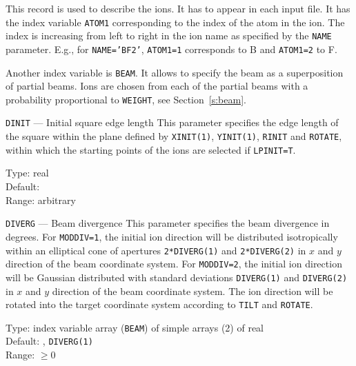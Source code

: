 This record is used to describe the ions. It has to appear in each input file. 
It has the index variable \texttt{ATOM1} corresponding to the index of the atom
in the ion. The index is increasing from left to right in the ion name as
specified by the \texttt{NAME} parameter. E.g., for \texttt{NAME='BF2'},
\texttt{ATOM1=1} corresponds to B and \texttt{ATOM1=2} to F. 

Another index variable is \texttt{BEAM}. It allows to specify the beam as a
superposition of partial beams. Ions are chosen from each of the partial beams
with a probability proportional to \texttt{WEIGHT}, see Section~\ref{s:beam}.

\ifprivate
\begin{keydescription}{\texttt{DINIT} --- Initial square edge length}
%
  This parameter specifies the edge length of the square within the
  plane defined by \texttt{XINIT(1)}, \texttt{YINIT(1)}, \texttt{RINIT} and
  \texttt{ROTATE}, within which the starting points of the ions are
  selected if \texttt{LPINIT=T}.
%
  \begin{keytab}
    Type:    \> real \\
    Default:  \\
    Range:   \> arbitrary
  \end{keytab}
\end{keydescription}
\fi

\begin{keydescription}{\texttt{DIVERG} --- Beam divergence}
%
  This parameter specifies the beam divergence in degrees. For
  \texttt{MODDIV=1}, the initial ion direction will be distributed
  isotropically within an elliptical cone of apertures \texttt{2*DIVERG(1)}
  and \texttt{2*DIVERG(2)} in $x$ and $y$ direction of the beam coordinate
  system. For \texttt{MODDIV=2}, the initial ion direction will be
  Gaussian distributed with standard deviations \texttt{DIVERG(1)}
  and \texttt{DIVERG(2)} in $x$ and $y$ direction of the beam coordinate
  system. The ion direction will be rotated into the target coordinate
  system according to \texttt{TILT} and \texttt{ROTATE}.
%
  \begin{keytab}
    Type:    \> index variable array (\texttt{BEAM}) of simple arrays (2) of
                real \\
    Default: , \texttt{DIVERG(1)} \\
    Range:   \> $\ge 0$
  \end{keytab}
\end{keydescription}

